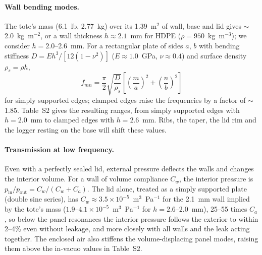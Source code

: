\documentclass[11pt]{article}
\begin{document}
\paragraph{Wall bending modes.} The tote's mass (6.1~lb, 2.77~kg) over its 1.39~m$^2$ of wall, base
and lid gives $\sim$2.0~kg~m$^{-2}$, or a wall thickness $h \approx 2.1$~mm for HDPE
($\rho = 950$~kg~m$^{-3}$); we consider $h = 2.0$--2.6~mm. For a rectangular plate of sides $a$, $b$
with bending stiffness $D = Eh^3/[12(1-\nu^2)]$ ($E \approx 1.0$~GPa, $\nu \approx 0.4$) and surface
density $\rho_s = \rho h$,
\begin{equation}
  f_{mn} = \frac{\pi}{2}\sqrt{\frac{D}{\rho_s}}\left[\left(\frac{m}{a}\right)^2 + \left(\frac{n}{b}\right)^2\right]
\end{equation}
for simply supported edges; clamped edges raise the frequencies by a factor of $\sim$1.85.
Table~S2 gives the resulting ranges, from simply supported edges with $h = 2.0$~mm to clamped edges
with $h = 2.6$~mm. Ribs, the taper, the lid rim and the logger resting on the base will shift these
values.


\paragraph{Transmission at low frequency.} Even with a perfectly sealed lid, external pressure
deflects the walls and changes the interior volume. For a wall of volume compliance $C_w$, the
interior pressure is $p_\text{in}/p_\text{out} = C_w/(C_w + C_a)$. The lid alone, treated as a simply
supported plate (double sine series), has $C_w \approx 3.5\times10^{-5}$~m$^3$~Pa$^{-1}$ for the
2.1~mm wall implied by the tote's mass ($1.9$--$4.1\times10^{-5}$~m$^3$~Pa$^{-1}$ for $h = 2.6$--2.0~mm),
25--55 times $C_a$, so below the panel resonances the interior pressure follows the exterior to within
2--4\% even without leakage,
and more closely with all walls and the leak acting together. The enclosed air also stiffens the
volume-displacing panel modes, raising them above the in-vacuo values in Table~S2.
\end{document}

